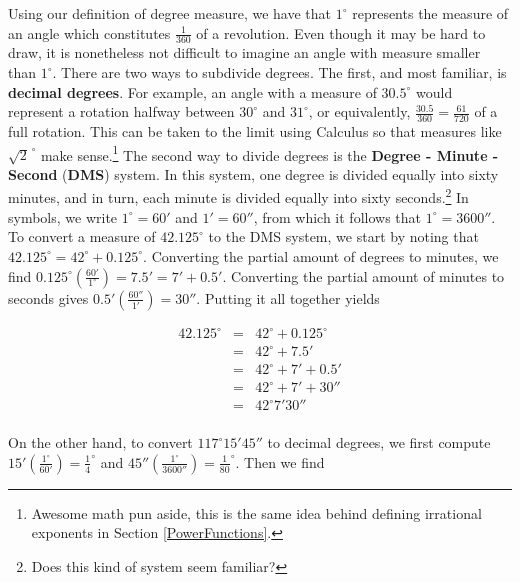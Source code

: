 \documentclass{ximera}
\begin{document}
Using our definition of degree measure, we have that $1^{\circ}$ represents the measure of an angle which constitutes $\frac{1}{360}$ of a revolution.  Even though it may be hard to draw, it is nonetheless not difficult to imagine an angle with measure smaller than $1^{\circ}$.  There are two ways to subdivide degrees.  The first, and most familiar, is \textbf{decimal degrees}.  For example, an angle with a measure of $30.5^{\circ}$ would represent a rotation halfway between $30^{\circ}$ and $31^{\circ}$, or equivalently, $\frac{30.5}{360} = \frac{61}{720}$ of a full rotation.  This can be taken to the limit using Calculus so that measures like $\sqrt{2}^{\, \circ}$ make sense.\footnote{Awesome math pun aside, this is the same idea behind defining irrational exponents in Section \ref{PowerFunctions}.}  The second way to divide degrees is the \textbf{Degree - Minute - Second} (\textbf{DMS}) system.  In this system, one degree is divided equally into sixty minutes, and in turn, each minute is divided equally into sixty seconds.\footnote{Does this kind of system seem familiar?}  In symbols, we write $1^{\circ} = 60'$ and $1' = 60''$, from which it follows that  $1^{\circ} = 3600''$.  To convert a measure of $42.125^{\circ}$ to the DMS system, we start by noting that $42.125^{\circ} = 42^{\circ} + 0.125^{\circ}$. Converting the partial amount of degrees to minutes, we find $0.125^{\circ} \left( \frac{60'}{1^{\circ}} \right) = 7.5' = 7' + 0.5'$. Converting the partial amount of minutes to seconds gives  $0.5' \left(\frac{60''}{1'} \right) = 30''$.  Putting it all together yields 

\[ \begin{array}{rcl}

42.125^{\circ} & = &  42^{\circ} + 0.125^{\circ} \\
               & = & 42^{\circ} + 7.5' \\
               & = & 42^{\circ} + 7' + 0.5' \\
               & = & 42^{\circ} + 7' + 30'' \\
               & = & 42^{\circ} 7' 30'' \\ \end{array} \]
      
On the other hand, to convert $117^{\circ}15'45''$ to decimal degrees, we first compute $15' \left(\frac{1^{\circ}}{60'}\right) = \frac{1}{4}^{\circ}$ and $45'' \left(\frac{1^{\circ}}{3600''}\right) = \frac{1}{80}^{\circ}$. Then we find
\end{document}
